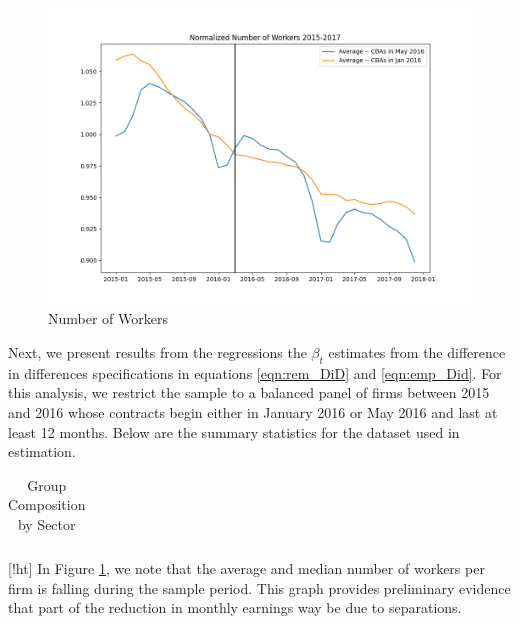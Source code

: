 \documentclass[12pt]{article}
\begin{document}
		\begin{figure}[!ht]
			\centering
			\caption{Number of Workers}
			\label{fig:NormEmp}
			\includegraphics[scale = .65]{tables-figures/normalized_avg_emp_2015_2017.png}
		\end{figure}
		Next, we present results from the regressions the $\beta_t$ estimates from the difference in differences specifications in equations \ref{eqn:rem_DiD} and  \ref{eqn:emp_Did}. For this analysis, we restrict the sample to a balanced panel of firms between 2015 and 2016 whose contracts begin either in January 2016 or May 2016 and last at least 12 months. Below are the summary statistics for the dataset used in estimation. 

		\begin{table}[!ht]
			\caption{Group Composition by Sector}
			\label{tab:sectors}
			\begin{tabular}{lrrr}
				
			\end{tabular}
		\end{table}

	[!ht]
		In Figure \ref{fig:NormEmp}, we note that the average and median number of workers per firm is falling during the sample period. This graph provides preliminary evidence that part of the reduction in monthly earnings way be due to separations. 
\end{document}
